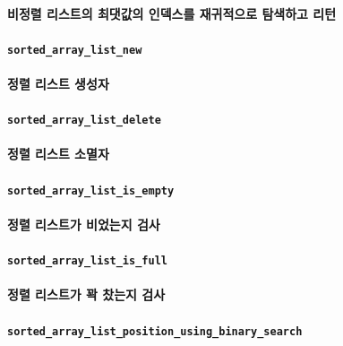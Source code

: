 \documentclass[UTF8, a4paper]{report}
\begin{document}
            \paragraph{%
                \normalfont 비정렬 리스트의 최댓값의 인덱스를 재귀적으로 탐색하고 리턴
            }

            \paragraph{\texttt{sorted\_array\_list\_new}}
            \paragraph{%
                \normalfont 정렬 리스트 생성자
            }

            \paragraph{\texttt{sorted\_array\_list\_delete}}
            \paragraph{%
                \normalfont 정렬 리스트 소멸자
            }

            \paragraph{\texttt{sorted\_array\_list\_is\_empty}}
            \paragraph{%
                \normalfont 정렬 리스트가 비었는지 검사
            }

            \paragraph{\texttt{sorted\_array\_list\_is\_full}}
            \paragraph{%
                \normalfont 정렬 리스트가 꽉 찼는지 검사
            }

            \paragraph{\texttt{sorted\_array\_list\_position\_using\_binary\_search}}
\end{document}
